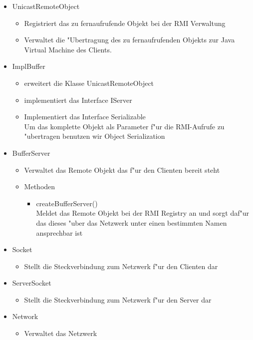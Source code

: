\documentclass[a4paper,10pt]{article}
\begin{document}
\begin{itemize}
\item UnicastRemoteObject
\begin{itemize}
\item Registriert das zu fernaufrufende Objekt bei der RMI Verwaltung
\item Verwaltet die "Ubertragung des zu fernaufrufenden Objekts zur Java Virtual Machine des Clients.
\end{itemize}
\item ImplBuffer
\begin{itemize}
\item erweitert die Klasse UnicastRemoteObject
\item implementiert das Interface IServer
\item Implementiert das Interface Serializable
\\Um das komplette Objekt als Parameter f"ur die RMI-Aufrufe zu "ubertragen benutzen wir Object Serialization 
\end{itemize}
\item BufferServer
\begin{itemize}
\item Verwaltet das Remote Objekt das f"ur den Clienten bereit steht  
\end{itemize}
\begin {itemize}
\item Methoden
\begin{itemize}
\item createBufferServer()
\\Meldet das Remote Objekt bei der RMI Registry an und sorgt daf"ur das dieses "uber das Netzwerk unter einen bestimmten Namen ansprechbar ist
\end{itemize}
\end{itemize}
\item Socket
\begin{itemize}
\item Stellt die Steckverbindung zum Netzwerk f"ur den Clienten dar
\end{itemize}
\item ServerSocket
\begin{itemize}
\item Stellt die Steckverbindung zum Netzwerk f"ur den Server dar
\end{itemize}
\item Network
\begin{itemize}
\item Verwaltet das Netzwerk
\end{itemize}

\end{itemize}
\end{document}
